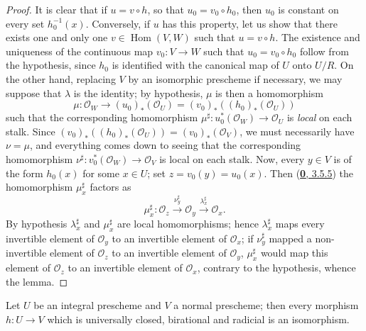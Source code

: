\begin{proof}
It is clear that if $u=v\circ h$, so that $u_0=v_0\circ h_0$, then $u_0$ is
constant on every set $h_0^{-1}(x)$. Conversely, if $u$ has this
property, let us show that there exists one and only one
$v\in\operatorname{Hom}(V,W)$ such that $u=v\circ h$. The existence and
uniqueness of the continuous map $v_0:V\to W$ such that $u_0=v_0\circ h_0$
follow from the hypothesis, since $h_0$ is identified with the canonical
map of $U$ onto $U/R$. On the other hand, replacing $V$ by an isomorphic
prescheme if necessary, we may suppose that $\lambda$ is the identity; by
hypothesis, $\mu$ is then a homomorphism
\[
  \mu:\mathcal{O}_W\longrightarrow(u_0)_*(\mathcal{O}_U)
  =(v_0)_*((h_0)_*(\mathcal{O}_U))
\]
such that the corresponding homomorphism
$\mu^\sharp:u_0^*(\mathcal{O}_W)\to\mathcal{O}_U$ is \emph{local} on each
stalk. Since
$(v_0)_*((h_0)_*(\mathcal{O}_U))=(v_0)_*(\mathcal{O}_V)$, we must
necessarily have $\nu=\mu$, and everything comes down to seeing that the
corresponding homomorphism $\nu^\sharp:v_0^*(\mathcal{O}_W)\to\mathcal{O}_V$
is local on each stalk. Now, every $y\in V$ is of the form $h_0(x)$ for some
$x\in U$; set $z=v_0(y)=u_0(x)$. Then
(\hyperref[0.3.5.5]{\textbf{0}, 3.5.5}) the homomorphism $\mu_x^\sharp$ factors
as
\[
  \mu_x^\sharp:\mathcal{O}_z
  \xrightarrow{\nu_y^\sharp}\mathcal{O}_y
  \xrightarrow{\lambda_x^\sharp}\mathcal{O}_x.
\]
By hypothesis $\lambda_x^\sharp$ and $\mu_x^\sharp$ are local
homomorphisms; hence $\lambda_x^\sharp$ maps every invertible element of
$\mathcal{O}_y$ to an invertible element of $\mathcal{O}_x$; if
$\nu_y^\sharp$ mapped a non-invertible element of $\mathcal{O}_z$ to
an invertible element of $\mathcal{O}_y$, $\mu_x^\sharp$ would map this
element of $\mathcal{O}_z$ to an invertible element of $\mathcal{O}_x$,
contrary to the hypothesis, whence the lemma.
\end{proof}

\begin{corollary}[8.11.2]
\label{II.8.11.2}
Let $U$ be an integral prescheme and $V$ a normal prescheme; then every
morphism $h:U\to V$ which is universally closed, birational and radicial is an
isomorphism.
\end{corollary}

